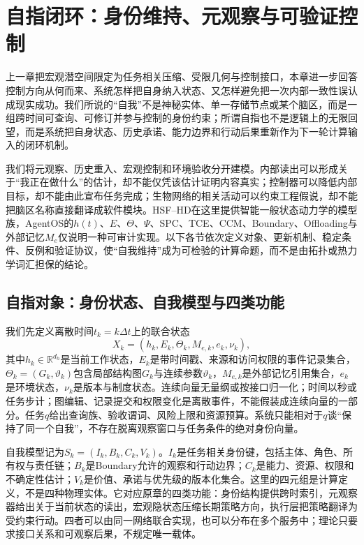 \chapter{自指闭环：身份维持、元观察与可验证控制}
\label{chp:topological_grand_unification_of_self_reference}

上一章把宏观潜空间限定为任务相关压缩、受限几何与控制接口，本章进一步回答控制方向从何而来、系统怎样把自身纳入状态、又怎样避免把一次内部一致性误认成现实成功。我们所说的“自我”不是神秘实体、单一存储节点或某个脑区，而是一组跨时间可查询、可修订并参与控制的身份约束；所谓自指也不是逻辑上的无限回望，而是系统把自身状态、历史承诺、能力边界和行动后果重新作为下一轮计算输入的闭环机制。

我们将元观察、历史重入、宏观控制和环境验收分开建模。内部读出可以形成关于“我正在做什么”的估计，却不能仅凭该估计证明内容真实；控制器可以降低内部目标，却不能由此宣布任务完成；生物网络的相关活动可以约束工程假说，却不能把脑区名称直接翻译成软件模块。HSF--HD在这里提供智能一般状态动力学的模型族，AgentOS的$h(t)$、$E$、$\Theta$、$\Psi$、SPC、TCE、CCM、Boundary、Offloading与外部记忆$M_e$仅说明一种可审计实现。以下各节依次定义对象、更新机制、稳定条件、反例和验证协议，使“自我维持”成为可检验的计算命题，而不是由拓扑或热力学词汇担保的结论。

\section{自指对象：身份状态、自我模型与四类功能}
\label{sec:four_element_ontology_topological_basis}

我们先定义离散时间$t_k=k\Delta t$上的联合状态
\begin{equation}
X_k=(h_k,E_k,\Theta_k,M_{e,k},e_k,\nu_k),
\end{equation}
其中$h_k\in\mathbb{R}^{d_h}$是当前工作状态，$E_k$是带时间戳、来源和访问权限的事件记录集合，$\Theta_k=(G_k,\vartheta_k)$包含局部结构图$G_k$与连续参数$\vartheta_k$，$M_{e,k}$是外部记忆引用集合，$e_k$是环境状态，$\nu_k$是版本与制度状态。连续向量无量纲或按接口归一化；时间以秒或任务步计；图编辑、记录提交和权限变化是离散事件，不能假装成连续向量的一部分。任务$q$给出查询族、验收谓词、风险上限和资源预算。系统只能相对于$q$谈“保持了同一个自我”，不存在脱离观察窗口与任务条件的绝对身份向量。

自我模型记为$S_k=(I_k,B_k,C_k,V_k)$。$I_k$是任务相关身份键，包括主体、角色、所有权与责任链；$B_k$是Boundary允许的观察和行动边界；$C_k$是能力、资源、权限和不确定性估计；$V_k$是价值、承诺与优先级的版本化集合。这里的四元组是计算定义，不是四种物理实体。它对应原章的四类功能：身份结构提供跨时索引，元观察器给出关于当前状态的读出，宏观隐状态压缩长期策略方向，执行层把策略翻译为受约束行动。四者可以由同一网络联合实现，也可以分布在多个服务中；理论只要求接口关系和可观察后果，不规定唯一载体。

